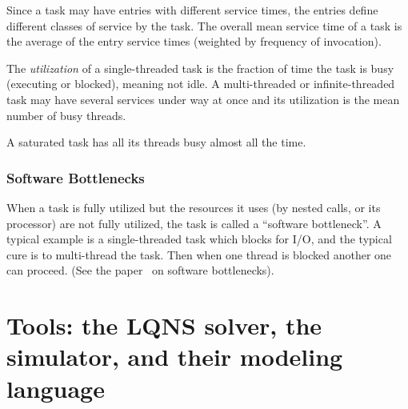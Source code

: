 \documentclass[11pt]{article}
\begin{document}
Since a task may have entries with different service times, the entries define different classes
of service by the task. The overall mean service time of a task is the average of the entry service
times (weighted by frequency of invocation).

The \emph{utilization} of a single-threaded task is the fraction of time the task is busy (executing or
blocked), meaning not idle. A multi-threaded or infinite-threaded task may have several services
under way at once and its utilization is the mean number of busy threads.

A saturated task has all its threads busy almost all the time.

\subsubsection{Software Bottlenecks}

When a task is fully utilized but the resources it uses (by nested calls, or its processor) are not
fully utilized, the task is called a ``software bottleneck''. A typical example is a single-threaded task
which blocks for I/O, and the typical cure is to multi-thread the task. Then when one thread is
blocked another one can proceed. (See the paper~\cite{perf:franks-2006-qest-bottlenecks} on software bottlenecks).

\section{Tools: the LQNS solver, the simulator, and their modeling language}
\label{sec:tools}
\end{document}
